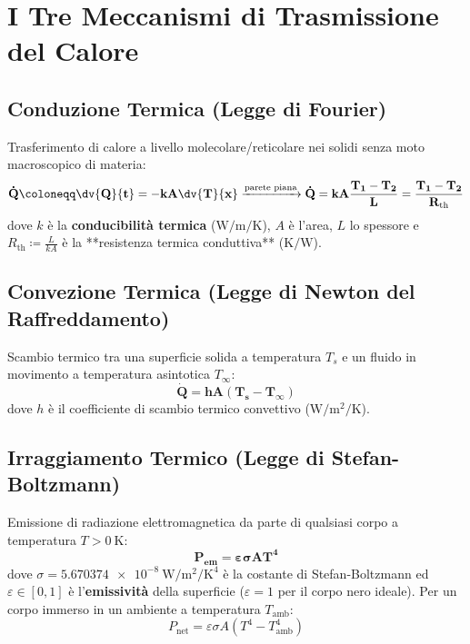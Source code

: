 \section{I Tre Meccanismi di Trasmissione del Calore}
\label{sec:trasmissione_calore}

\subsection{Conduzione Termica (Legge di Fourier)}
Trasferimento di calore a livello molecolare/reticolare nei solidi senza moto macroscopico di materia:
\begin{equation}
    \mathbf{\dot{Q} \coloneqq \dv{Q}{t} = -k A \dv{T}{x} \xrightarrow{\text{parete piana}} \dot{Q} = k A \frac{T_1 - T_2}{L} = \frac{T_1 - T_2}{R_{\text{th}}}}
    \label{eq:fourier}
\end{equation}
dove $k$ è la \textbf{conducibilità termica} ($\si{\watt\per\metre\per\kelvin}$), $A$ è l'area, $L$ lo spessore e $R_{\text{th}} \coloneqq \frac{L}{k A}$ è la **resistenza termica conduttiva** ($\si{\kelvin\per\watt}$).

\subsection{Convezione Termica (Legge di Newton del Raffreddamento)}
Scambio termico tra una superficie solida a temperatura $T_s$ e un fluido in movimento a temperatura asintotica $T_\infty$:
\begin{equation}
    \mathbf{\dot{Q} = h A (T_s - T_\infty)}
    \label{eq:convezione}
\end{equation}
dove $h$ è il coefficiente di scambio termico convettivo ($\si{\watt\per\metre\squared\per\kelvin}$).

\subsection{Irraggiamento Termico (Legge di Stefan-Boltzmann)}
Emissione di radiazione elettromagnetica da parte di qualsiasi corpo a temperatura $T > \SI{0}{\kelvin}$:
\begin{equation}
    \mathbf{P_{\text{em}} = \varepsilon \sigma A T^4}
    \label{eq:stefan_boltzmann}
\end{equation}
dove $\sigma = \SI{5.670374e-8}{\watt\per\metre\squared\per\kelvin\tothe{4}}$ è la costante di Stefan-Boltzmann ed $\varepsilon \in [0, 1]$ è l'\textbf{emissività} della superficie ($\varepsilon=1$ per il corpo nero ideale). Per un corpo immerso in un ambiente a temperatura $T_{\text{amb}}$:
\begin{equation}
    P_{\text{net}} = \varepsilon \sigma A (T^4 - T_{\text{amb}}^4)
\end{equation}
